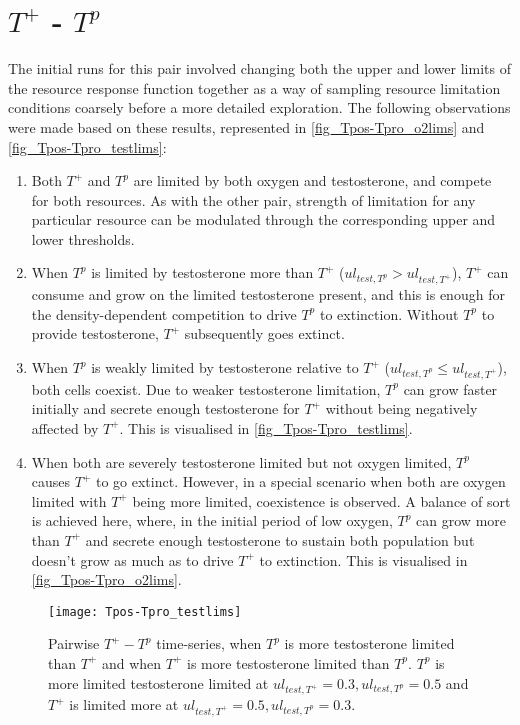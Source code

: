 \section{$T^+$ - $T^p$}
The initial runs for this pair involved changing both the upper and lower limits of the resource response function together as a way of sampling resource limitation conditions coarsely before a more detailed exploration. The following observations were made based on these results, represented in \autoref{fig_Tpos-Tpro_o2lims} and \autoref{fig_Tpos-Tpro_testlims}:
\begin{enumerate}
    \item Both $T^+$ and $T^p$ are limited by both oxygen and testosterone, and compete for both resources. As with the other pair, strength of limitation for any particular resource can be modulated through the corresponding upper and lower thresholds.
    \item When $T^p$ is limited by testosterone more than $T^+$ ($ul_{test,T^p} > ul_{test,T^+}$), $T^+$ can consume and grow on the limited testosterone present, and this is enough for the density-dependent competition to drive $T^p$ to extinction. Without $T^p$ to provide testosterone, $T^+$ subsequently goes extinct.
    \item When $T^p$ is weakly limited by testosterone relative to $T^+$ ($ul_{test,T^p} \leq ul_{test,T^+}$), both cells coexist. Due to weaker testosterone limitation, $T^p$ can grow faster initially and secrete enough testosterone for $T^+$ without being negatively affected by $T^+$. This is visualised in \autoref{fig_Tpos-Tpro_testlims}.
    \item When both are severely testosterone limited but not oxygen limited, $T^p$ causes $T^+$ to go extinct. However, in a special scenario when both are oxygen limited with $T^+$ being more limited, coexistence is observed. A balance of sort is achieved here, where, in the initial period of low oxygen, $T^p$ can grow more than $T^+$ and secrete enough testosterone to sustain both population but doesn’t grow as much as to drive $T^+$ to extinction. This is visualised in \autoref{fig_Tpos-Tpro_o2lims}.
  \end{enumerate}

\begin{figure}[h!]
  \centering
  \texttt{[image: Tpos-Tpro\_testlims]}
  \caption[Pairwise $T^+ - T^p$ time-series, testosterone limitation]{Pairwise $T^+ - T^p$ time-series, when $T^p$ is more testosterone limited than $T^+$ and when $T^+$ is more testosterone limited than $T^p$. $T^p$ is more limited testosterone limited at $ul_{test,T^+}=0.3,ul_{test,T^p}=0.5$ and $T^+$ is limited more at $ul_{test,T^+}=0.5,ul_{test,T^p}=0.3$.}
  \label{fig_Tpos-Tpro_testlims}
\end{figure}

